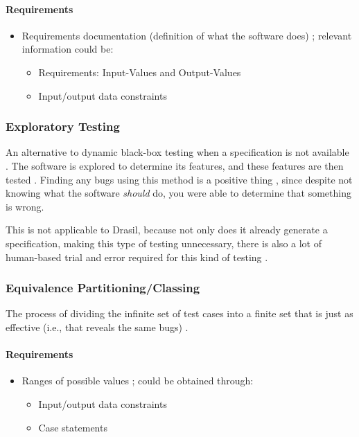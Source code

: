 \paragraph{Requirements}
\begin{itemize}
      \item Requirements documentation (definition of what the software does)
            \cite[p.~64]{patton_software_2006}; relevant information could be:
            \begin{itemize}
                  \item Requirements: Input-Values and Output-Values
                  \item Input/output data constraints
            \end{itemize}
\end{itemize}

\subsubsection{Exploratory Testing \cite[p.~65]{patton_software_2006}}

An alternative to dynamic black-box testing when a specification is not
available \cite[p.~65]{patton_software_2006}. The software is explored to
determine its features, and these features are then tested
\cite[p.~65]{patton_software_2006}. Finding any bugs using this method is a
positive thing \cite[p.~65]{patton_software_2006}, since despite not knowing
what the software \emph{should} do, you were able to determine that something
is wrong.

This is not applicable to Drasil, because not only does it already generate a
specification, making this type of testing unnecessary, there is also a lot of
human-based trial and error required for this kind of testing
\cite{june_11_meeting}.

\subsubsection{Equivalence Partitioning/Classing \cite[p.~67-69]{patton_software_2006}}

The process of dividing the infinite set of test cases into a finite set that is
just as effective (i.e., that reveals the same bugs) \cite[p.~67]{patton_software_2006}.

\paragraph{Requirements}
\begin{itemize}
      \item Ranges of possible values \cite[p.~67]{patton_software_2006};
            could be obtained through:
            \begin{itemize}
                  \item Input/output data constraints
                  \item Case statements
            \end{itemize}
\end{itemize}

